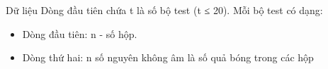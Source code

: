 Dữ liệu
Dòng đầu tiên chứa t là số bộ test (t ≤ 20). Mỗi bộ test có dạng:  
\begin{itemize}
	\item     Dòng đầu tiên: n - số hộp.    


	\item     Dòng thứ hai: n số nguyên không âm là số quả bóng trong các hộp   
\end{itemize}